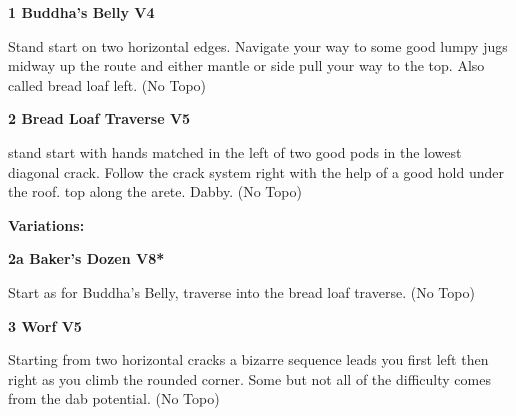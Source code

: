 \begin{multicols}{2}
\begin{minipage}{\columnwidth}
			\end{minipage}
			
					\begin{minipage}{\linewidth}	
					\label{rt:Buddha's Belly}
\colorbox{RoyalBlue!20}{
\parbox{0.95\textwidth}{
\textbf{
1 Buddha's Belly V4    
}
}
}

					\begin{adjustwidth}{0.5cm}{}				
					Stand start on two horizontal edges. Navigate your way to some good lumpy jugs midway up the route and either mantle or side pull your way to the top. Also called bread loaf left.
						\newline (No Topo) 
					\end{adjustwidth}
					\end{minipage}
					\begin{minipage}{\linewidth}	
					\label{rt:Bread Loaf Traverse}
\colorbox{RoyalBlue!20}{
\parbox{0.95\textwidth}{
\textbf{
2 Bread Loaf Traverse V5    
}
}
}

					\begin{adjustwidth}{0.5cm}{}				
					stand start with hands matched in the left of two good pods in the lowest diagonal crack. Follow the crack system right with the help of a good hold under the roof. top along the arete. Dabby.
						\newline (No Topo) 
					\end{adjustwidth}
					\end{minipage}
						\begin{adjustwidth}{0.5cm}{}				
						\textbf{Variations:} \newline
							\begin{minipage}{\linewidth}	
							\label{vr:Baker's Dozen}
\colorbox{Goldenrod!50}{
\parbox{0.95\textwidth}{
\textbf{
2a Baker's Dozen V8*  
}
}
}

							\begin{adjustwidth}{0.5cm}{}				
							Start as for Buddha's Belly, traverse into the bread loaf traverse.
								\newline (No Topo) 
							\end{adjustwidth}
							\end{minipage}
						\end{adjustwidth}
					\begin{minipage}{\linewidth}	
					\label{rt:Worf}
\colorbox{RoyalBlue!20}{
\parbox{0.95\textwidth}{
\textbf{
3 Worf V5    
}
}
}

					\begin{adjustwidth}{0.5cm}{}				
					Starting from two horizontal cracks a bizarre sequence leads you first left then right as you climb the rounded corner. Some but not all of the difficulty comes from the dab potential.
						\newline (No Topo) 
					\end{adjustwidth}
					\end{minipage}
			\begin{minipage}{\columnwidth}

\end{minipage}
\end{multicols}
